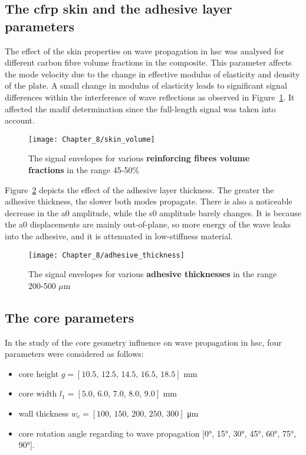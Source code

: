 \subsection{The \acl{cfrp} skin and the adhesive layer parameters}

The effect of the skin properties on wave propagation in \ac{hsc} was analysed for different carbon fibre volume fractions in the composite.
This parameter affects the mode velocity due to the change in effective modulus of elasticity and density of the plate.
A small change in modulus of elasticity leads to significant signal differences within the interference of wave reflections as observed in Figure~\ref{fig:skin_volume}.
It affected the \ac{madif} determination since the full-length signal was taken into account.
\begin{figure}[!tbh]
	\begin{center}
		\texttt{[image: Chapter\_8/skin\_volume]}
	\end{center}
		\caption{The signal envelopes for various \textbf{reinforcing fibres volume fractions} in the range 45-50\%}
	\label{fig:skin_volume}
\end{figure}
\pagebreak

Figure~\ref{fig:adhesive_thickness} depicts the effect of the adhesive layer thickness.
The greater the adhesive thickness, the slower both modes propagate.
There is also a noticeable decrease in the \ac{a0} amplitude, while the \ac{s0} amplitude barely changes.
It is because the \ac{a0} displacements are mainly out-of-plane, so more energy of the wave leaks into the adhesive, and it is attenuated in low-stiffness material.

\begin{figure}[!tbh]
	\begin{center}
		\texttt{[image: Chapter\_8/adhesive\_thickness]}
	\end{center}
	\caption{The signal envelopes for various \textbf{adhesive thicknesses} in the range 200-500 \(\mu\)m}
	\label{fig:adhesive_thickness}
\end{figure}

\subsection{The core parameters}
In the study of the core geometry influence on wave propagation in \ac{hsc}, four parameters were considered as follows:
\begin{itemize}
	\item core height \(g=[10.5,\,12.5,\,14.5,\,16.5,\,18.5]\) \unit{\mm}
	\item core width \(l_1=[5.0,\,6.0,\,7.0,\,8.0,\,9.0]\) \unit{\mm}
	\item wall thickness \(w_c=[100,\,150,\,200,\,250,\,300]\) \unit{\micro\m}
	\item core rotation angle regarding to wave propagation [\ang{0}, \ang{15}, \ang{30}, \ang{45}, \ang{60}, \ang{75}, \ang{90}].
\end{itemize}

